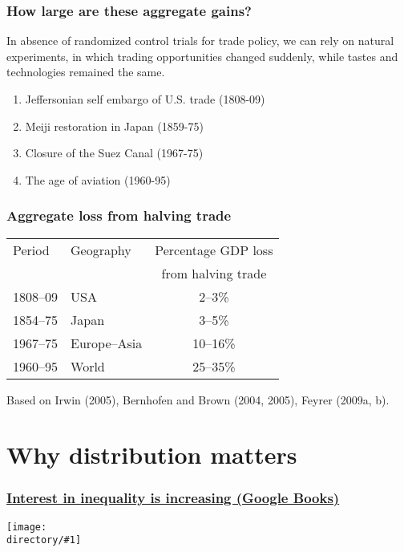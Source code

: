 \documentclass[aspectratio=169,compress,mathserif]{beamer}
\newcounter{ora}
\newcommand{\directory}{./exhibits}
\newcommand{\widefigure}[2]{\begin{frame}\frametitle{\hyperlink{#1back}{#2}}\hypertarget{#1}{{\begin{center}\texttt{[image: \\directory/\#1]}\end{center}}}\end{frame}}
\begin{document}
\begin{frame}\frametitle{How large are these aggregate gains?}\hypertarget{How large are these aggregate gains?}{}
In absence of randomized control trials for trade policy, we can rely on natural experiments, in which trading opportunities changed suddenly, while tastes and technologies remained the same.
\begin{enumerate}\setcounter{enumi}{0}
\item Jeffersonian self embargo of U.S. trade (1808-09)

\item Meiji restoration in Japan (1859-75)

\item Closure of the Suez Canal (1967-75)

\item The age of aviation (1960-95)


\end{enumerate}
\end{frame}



\begin{frame}\frametitle{Aggregate loss from halving trade}\hypertarget{Aggregate loss from halving trade}{}
\begin{tabular}{llc}
Period & Geography      & Percentage GDP loss \\
                &                       & from halving trade    \\
\hline
1808--09 & USA & 2--3\% \\
1854--75 & Japan & 3--5\% \\
1967--75 & Europe--Asia & 10--16\% \\
1960--95 & World & 25--35\% \\
\end{tabular}


\bigskip
{\footnotesize Based on 
Irwin (2005),
Bernhofen and Brown (2004, 2005),
Feyrer (2009a, b).}




\end{frame}







\section{Why distribution matters}\hypertarget{Why distribution matters}{}
\widefigure{google-books}{Interest in inequality is increasing (Google Books)}
\end{document}
